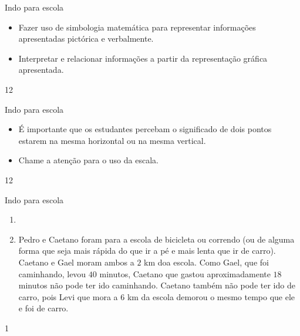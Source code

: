 \def\currentcolor{session2}
\begin{objectives}{Indo para escola}
{
\begin{itemize}

\item Fazer uso de simbologia matemática para representar informações apresentadas pictórica e verbalmente.

\item Interpretar e relacionar informações a partir da representação gráfica apresentada.

\end{itemize}
}{1}{2}
\end{objectives}
\begin{sugestions}{Indo para escola}
{
\begin{itemize}
\item É importante que os estudantes percebam o significado de dois pontos estarem na mesma horizontal ou na mesma vertical.

\item Chame a atenção para o uso da escala.
\end{itemize}
}{1}{2}
\end{sugestions}
\begin{answer}{Indo para escola}
{
\begin{enumerate}

\item{}

\item Pedro e Caetano foram para a escola de bicicleta ou correndo (ou de alguma forma que seja mais rápida do que ir a pé e mais lenta que ir de carro). Caetano e Gael moram ambos a $2$ km doa escola. Como Gael, que foi caminhando, levou $40$ minutos, Caetano que gastou aproximadamente $18$ minutos não pode ter ido caminhando. Caetano também não pode ter ido de carro, pois Levi que mora a $6$ km da escola demorou o mesmo tempo que ele e foi de carro.

\end{enumerate}
}{1}
\end{answer}
